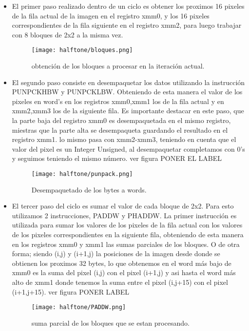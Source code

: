 \begin{itemize}
	\item El primer paso realizado dentro de un ciclo es obtener los proximos 16 pixeles de la fila actual de la imagen en el registro xmm0, y los 16 pixeles correspondientes de la fila siguiente en el registro xmm2, para luego trabajar con 8 bloques de 2x2 a la misma vez. 

	\begin{figure}[H]
		\centering
		\texttt{[image: halftone/bloques.png]}
		\caption{obtención de los bloques a procesar en la iteración actual.}
		\label{bloques}
	\end{figure}

	\item El segundo paso consiste en desempaquetar los datos utilizando la instrucción PUNPCKHBW y PUNPCKLBW. Obteniendo de esta manera el valor de los pixeles en word's en los registros xmm0,xmm1 los de la fila actual y en xmm2,xmm3 los de la siguiente fila.
	Es importante destacar en este paso, que la parte baja del registro xmm0 es desempaquetada en el mismo registro, miestras que la parte alta se desempaqueta guardando el resultado en el registro xmm1. lo mismo pasa con xmm2-xmm3, teniendo en cuenta que el valor del pixel es un Integer Unsigned, al desempaquetar completamos con 0's y seguimos teniendo el mismo número. ver figura PONER EL LABEL

	\begin{figure}[H]
		\centering
		\texttt{[image: halftone/punpack.png]}
		\caption{Desempaquetado de los bytes a words.}
		\label{PUNPCK}
	\end{figure}

	\item El tercer paso del ciclo es sumar el valor de cada bloque de 2x2. Para esto utilizamos 2 instrucciones, PADDW y PHADDW. La primer instrucción es utilizada para sumar los valores de los pixeles de la fila actual con los valores de los pixeles correspondientes en la siguiente fila, obteniendo de esta manera en los registros xmm0 y xmm1 las sumas parciales de los bloques. O de otra forma; siendo (i,j) y (i+1,j) la posiciones de la imagen desde donde se obtienen los proximos 32 bytes, lo que obtenemos en el word más bajo de xmm0 es la suma del pixel (i,j) con el pixel (i+1,j) y asi hasta el word más alto de xmm1 donde tenemos la suma entre el pixel (i,j+15) con el pixel (i+1,j+15). ver figura PONER LABEL

	\begin{figure}[H]
		\centering
		\texttt{[image: halftone/PADDW.png]}
		\caption{suma parcial de los bloques que se estan procesando.}
		\label{PADDW}
	\end{figure}



\end{itemize}
